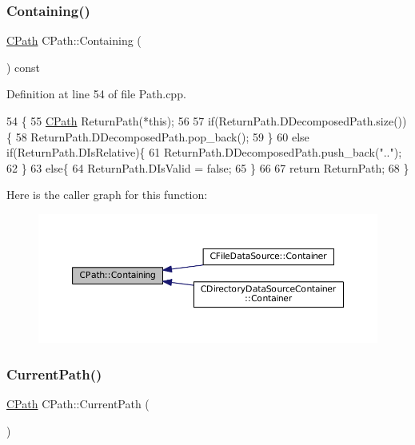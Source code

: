 \subsubsection{\texorpdfstring{Containing()}{Containing()}}
{\footnotesize\ttfamily \hyperlink{classCPath}{C\+Path} C\+Path\+::\+Containing (\begin{DoxyParamCaption}{ }\end{DoxyParamCaption}) const}



Definition at line 54 of file Path.\+cpp.


\begin{DoxyCode}
54                              \{
55     \hyperlink{classCPath}{CPath} ReturnPath(*\textcolor{keyword}{this});
56     
57     \textcolor{keywordflow}{if}(ReturnPath.DDecomposedPath.size())\{
58         ReturnPath.DDecomposedPath.pop\_back();
59     \}
60     \textcolor{keywordflow}{else} \textcolor{keywordflow}{if}(ReturnPath.DIsRelative)\{
61         ReturnPath.DDecomposedPath.push\_back(\textcolor{stringliteral}{".."});
62     \}
63     \textcolor{keywordflow}{else}\{
64         ReturnPath.DIsValid = \textcolor{keyword}{false};   
65     \}
66     
67     \textcolor{keywordflow}{return} ReturnPath;
68 \}
\end{DoxyCode}
Here is the caller graph for this function\+:\nopagebreak
\begin{figure}[H]
\begin{center}
\leavevmode
\includegraphics[width=350pt]{classCPath_a24d8c455b1663ce251d3a749437fa4fe_icgraph}
\end{center}
\end{figure}
\hypertarget{classCPath_a5161b834e754b217ddead2437eaaa223}{}\label{classCPath_a5161b834e754b217ddead2437eaaa223} 
\subsubsection{\texorpdfstring{Current\+Path()}{CurrentPath()}\hspace{0.1cm}{\footnotesize\ttfamily [1/2]}}
{\footnotesize\ttfamily \hyperlink{classCPath}{C\+Path} C\+Path\+::\+Current\+Path (\begin{DoxyParamCaption}{ }\end{DoxyParamCaption})\hspace{0.3cm}{\ttfamily [static]}}



